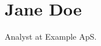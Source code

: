 \documentclass{article}
\begin{document}
\section*{Jane Doe}
Analyst at Example ApS.
\end{document}
